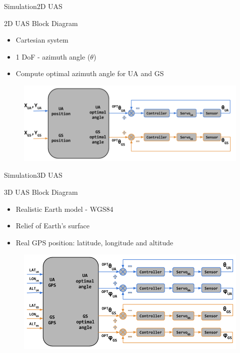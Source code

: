 \begin{frame}{Simulation}{2D UAS}
	\begin{block}{2D UAS Block Diagram}
		\begin{itemize}
		  	\item Cartesian system
		  	\item 1 DoF - azimuth angle ($\theta$)
		  	\item Compute optimal azimuth angle for UA and GS 
		\end{itemize}

		\begin{figure}
	        \includegraphics[scale=0.32]{figures/2D_system.png}
	    \end{figure}
    \end{block}
\end{frame}

\begin{frame}{Simulation}{3D UAS}
  \begin{block}{3D UAS Block Diagram}
	\begin{itemize}
	  	\item Realistic Earth model - WGS84
	  	\item Relief of Earth's surface 
	  	\item Real GPS position: latitude, longitude and altitude
	\end{itemize}

	\begin{figure}
		\includegraphics[scale=0.33]{figures/3D_system.png}
	\end{figure}
  \end{block}
\end{frame}

